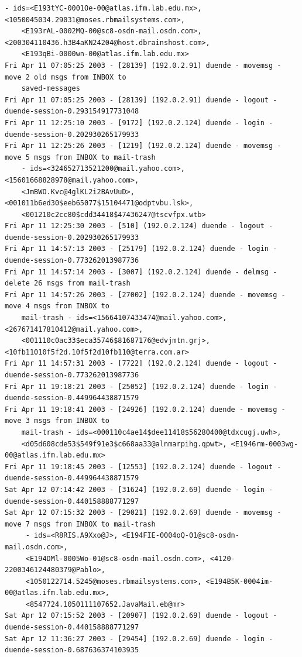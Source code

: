 \begin{lstlisting}[style=terminal]
    - ids=<E193tYC-0001Oe-00@atlas.ifm.lab.edu.mx>, <1050045034.29031@moses.rbmailsystems.com>, 
    <E193rAL-0002MQ-00@sc8-osdn-mail.osdn.com>, <200304110436.h3B4aKN24204@host.dbrainshost.com>, 
    <E193qBi-0000wn-00@atlas.ifm.lab.edu.mx>
Fri Apr 11 07:05:25 2003 - [28139] (192.0.2.91) duende - movemsg - move 2 old msgs from INBOX to 
    saved-messages
Fri Apr 11 07:05:25 2003 - [28139] (192.0.2.91) duende - logout - duende-session-0.293154917731048
Fri Apr 11 12:25:10 2003 - [9172] (192.0.2.124) duende - login - duende-session-0.202930265179933
Fri Apr 11 12:25:26 2003 - [1219] (192.0.2.124) duende - movemsg - move 5 msgs from INBOX to mail-trash 
    - ids=<324652713521200@mail.yahoo.com>, <15601668828978@mail.yahoo.com>, 
    <JmBWO.Kvc@4glKL2i2BAvUuD>, <001011b6ed30$eeb65077$15104471@odptvbu.lsk>, 
    <001210c2cc80$cdd34418$47436247@tscvfpx.wtb>
Fri Apr 11 12:25:30 2003 - [510] (192.0.2.124) duende - logout - duende-session-0.202930265179933
Fri Apr 11 14:57:13 2003 - [25179] (192.0.2.124) duende - login - duende-session-0.773262013987736
Fri Apr 11 14:57:14 2003 - [3007] (192.0.2.124) duende - delmsg - delete 26 msgs from mail-trash
Fri Apr 11 14:57:26 2003 - [27002] (192.0.2.124) duende - movemsg - move 4 msgs from INBOX to 
    mail-trash - ids=<15664107433474@mail.yahoo.com>, <267671417810412@mail.yahoo.com>, 
    <001110c0ac33$eca35746$81687176@edvjmtn.grj>, <10fb11010f5f2d.10f5f2d10fb110@terra.com.ar>
Fri Apr 11 14:57:31 2003 - [7722] (192.0.2.124) duende - logout - duende-session-0.773262013987736
Fri Apr 11 19:18:21 2003 - [25052] (192.0.2.124) duende - login - duende-session-0.449964438871579
Fri Apr 11 19:18:41 2003 - [24926] (192.0.2.124) duende - movemsg - move 3 msgs from INBOX to 
    mail-trash - ids=<000110c4ae14$dee11418$56280400@tdxcugj.uwh>, 
    <d05d608cde53$549f91e3$c668aa33@alnmarpihg.qpwt>, <E1946rm-0003wg-00@atlas.ifm.lab.edu.mx>
Fri Apr 11 19:18:45 2003 - [12553] (192.0.2.124) duende - logout - duende-session-0.449964438871579
Sat Apr 12 07:14:42 2003 - [31624] (192.0.2.69) duende - login - duende-session-0.440158888771297
Sat Apr 12 07:15:32 2003 - [29021] (192.0.2.69) duende - movemsg - move 7 msgs from INBOX to mail-trash
     - ids=<R8RIS.A9Xxo@J>, <E194FIE-0004oQ-01@sc8-osdn-mail.osdn.com>, 
     <E194DMl-0005Wo-01@sc8-osdn-mail.osdn.com>, <4120-2200346124480379@Pablo>, 
     <1050122714.5245@moses.rbmailsystems.com>, <E194B5K-0004im-00@atlas.ifm.lab.edu.mx>, 
     <8547724.1050111107652.JavaMail.eb@mr>
Sat Apr 12 07:15:52 2003 - [20907] (192.0.2.69) duende - logout - duende-session-0.440158888771297
Sat Apr 12 11:36:27 2003 - [29454] (192.0.2.69) duende - login - duende-session-0.687636374103935

\end{lstlisting}
